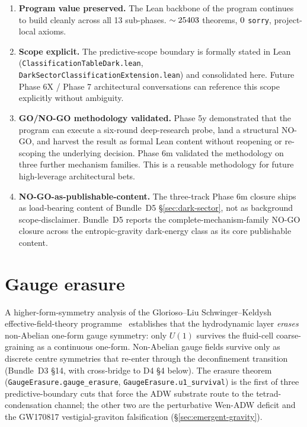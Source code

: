 \documentclass[aps,prd,reprint,nofootinbib,superscriptaddress]{revtex4-2}
\begin{document}
\begin{enumerate}
\item \textbf{Program value preserved.} The Lean backbone of the
  program continues to build cleanly across all 13 sub-phases.
  $\sim 25403$ theorems, $0$ \texttt{sorry},
  \axiomcount{} project-local axioms.
\item \textbf{Scope explicit.} The predictive-scope boundary is
  formally stated in Lean
  (\texttt{ClassificationTableDark.lean},
  \texttt{DarkSectorClassificationExtension.lean}) and consolidated
  here. Future Phase 6X / Phase 7 architectural conversations can
  reference this scope explicitly without ambiguity.
\item \textbf{GO/NO-GO methodology validated.} Phase 5y demonstrated
  that the program can execute a six-round deep-research probe, land
  a structural NO-GO, and harvest the result as formal Lean content
  without reopening or re-scoping the underlying decision. Phase 6m
  validated the methodology on three further mechanism families. This
  is a reusable methodology for future high-leverage architectural
  bets.
\item \textbf{NO-GO-as-publishable-content.} The three-track Phase 6m
  closure ships as load-bearing content of Bundle~D5
  \S\ref{sec:dark-sector}, not as background scope-disclaimer. Bundle~D5
  reports the complete-mechanism-family NO-GO closure across the
  entropic-gravity dark-energy class as its core publishable content.
\end{enumerate}


\section{Gauge erasure}
\label{sec:gauge-erasure}

A higher-form-symmetry analysis of the Glorioso--Liu Schwinger--Keldysh
effective-field-theory programme~\cite{GloriosoLiu2018} establishes
that the hydrodynamic layer \emph{erases} non-Abelian one-form gauge
symmetry: only $U(1)$ survives the fluid-cell coarse-graining as a
continuous one-form. Non-Abelian gauge fields survive only as discrete
centre symmetries that re-enter through the deconfinement transition
(Bundle~D3 \S 14, with cross-bridge to D4 \S 4 below). The erasure
theorem (\texttt{GaugeErasure.gauge\_erasure},
\texttt{GaugeErasure.u1\_survival}) is the first of three
predictive-boundary cuts that force the ADW substrate route to the
tetrad-condensation channel; the other two are the perturbative
Wen-ADW deficit and the GW170817 vestigial-graviton falsification
(\S\ref{sec:emergent-gravity}).
\end{document}
